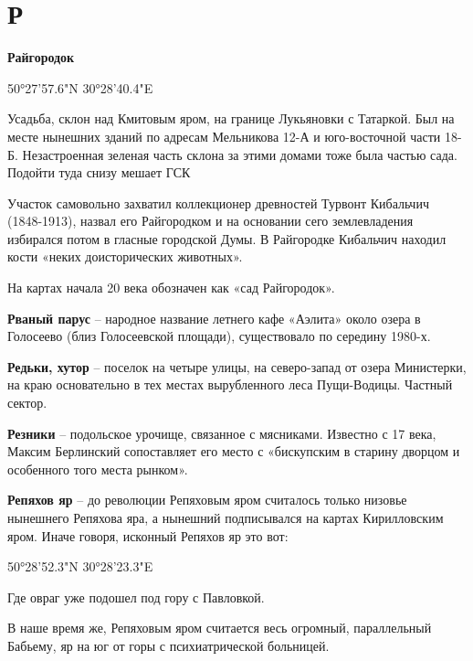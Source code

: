 \chapter*{Р}

\textbf{Райгородок}

50°27'57.6"N 30°28'40.4"E

Усадьба, склон над Кмитовым яром, на границе Лукьяновки с Татаркой. Был на месте нынешних зданий по адресам Мельникова 12-А и юго-восточной части 18-Б. Незастроенная зеленая часть склона за этими домами тоже была частью сада. Подойти туда снизу мешает ГСК

Участок самовольно захватил коллекционер древностей Турвонт Кибальчич (1848-1913), назвал его Райгородком и на основании сего землевладения избирался потом в гласные городской Думы. В Райгородке Кибальчич находил кости «неких доисторических животных».

На картах начала 20 века обозначен как «сад Райгородок».\\

\medskip

\textbf{Рваный парус} – народное название летнего кафе «Аэлита» около озера в Голосеево (близ Голосеевской площади), существовало по середину 1980-х.\\

\medskip

\textbf{Редьки, хутор} – поселок на четыре улицы, на северо-запад от озера Министерки, на краю основательно в тех  местах вырубленного леса Пущи-Водицы. Частный сектор.\\

\medskip

\textbf{Резники} – подольское урочище, связанное с мясниками. Известно с 17 века, Максим Берлинский сопоставляет его место с «бискупским в старину дворцом и особенного того места рынком».\\ 

\medskip

\textbf{Репяхов яр} – до революции Репяховым яром считалось только низовье нынешнего Репяхова яра, а нынешний подписывался на картах Кирилловским яром. Иначе говоря, исконный Репяхов яр это вот:

50°28'52.3"N 30°28'23.3"E

Где овраг уже подошел под гору с Павловкой.

В наше время же, Репяховым яром считается весь огромный, параллельный Бабьему, яр на юг от горы с психиатрической больницей.

